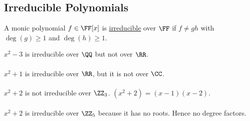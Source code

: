 \documentclass[class=scrartcl, crop=false]{standalone}
\begin{document}
\subsection{Irreducible Polynomials}

\begin{definition}
  A monic polynomial $f \in \FF[x]$ is \ul{irreducible} over $\FF$ if $f \neq gh$ with $\deg(g) \geq 1$ and $\deg(h) \geq 1$.
\end{definition} 

\begin{example}
  $x^2 - 3$ is irreducible over $\QQ$ but not over $\RR$.
  \\\\
  $x^2 + 1$ is irreducible over $\RR$, but it is not over $\CC$.
  \\\\
  $x^2 + 2$ is not irreducible over $\ZZ_3$. $(x^2 + 2) = (x - 1)(x - 2)$.
  \\\\
  $x^2 + 2$ is irreducible over $\ZZ_5$ because it has no roots. Hence no degree factors.
\end{example} 
\end{document}
